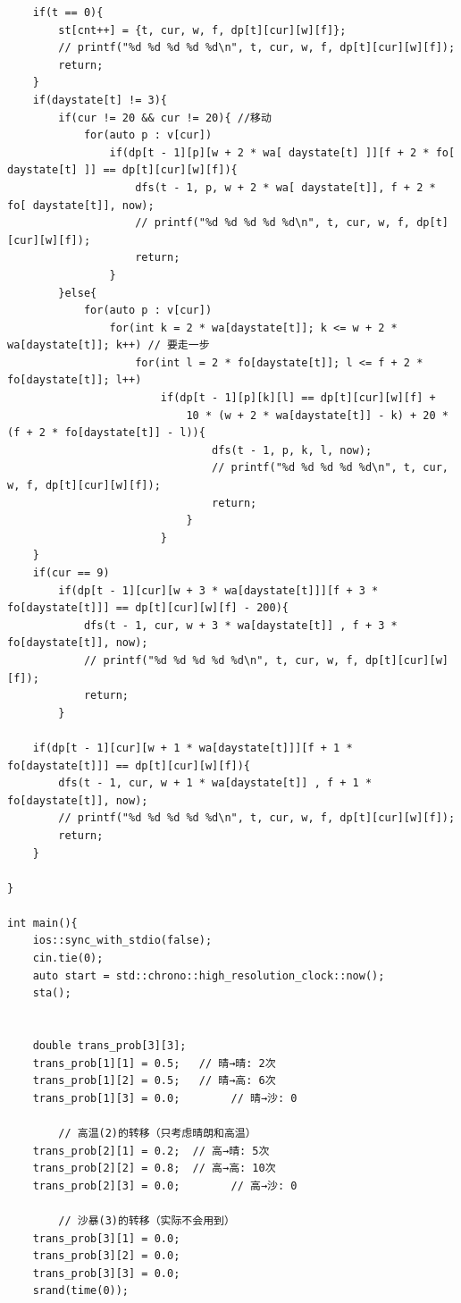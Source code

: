 \begin{verbatim}
    if(t == 0){
        st[cnt++] = {t, cur, w, f, dp[t][cur][w][f]};
        // printf("%d %d %d %d %d\n", t, cur, w, f, dp[t][cur][w][f]);
        return;
    }
    if(daystate[t] != 3){
        if(cur != 20 && cur != 20){ //移动
            for(auto p : v[cur])
                if(dp[t - 1][p][w + 2 * wa[ daystate[t] ]][f + 2 * fo[ daystate[t] ]] == dp[t][cur][w][f]){
                    dfs(t - 1, p, w + 2 * wa[ daystate[t]], f + 2 * fo[ daystate[t]], now);
                    // printf("%d %d %d %d %d\n", t, cur, w, f, dp[t][cur][w][f]);
                    return;
                }
        }else{
            for(auto p : v[cur])
                for(int k = 2 * wa[daystate[t]]; k <= w + 2 * wa[daystate[t]]; k++) // 要走一步
                    for(int l = 2 * fo[daystate[t]]; l <= f + 2 * fo[daystate[t]]; l++)
                        if(dp[t - 1][p][k][l] == dp[t][cur][w][f] + 
                            10 * (w + 2 * wa[daystate[t]] - k) + 20 * (f + 2 * fo[daystate[t]] - l)){
                                dfs(t - 1, p, k, l, now);
                                // printf("%d %d %d %d %d\n", t, cur, w, f, dp[t][cur][w][f]);
                                return;
                            }
                        }
    }
    if(cur == 9)
        if(dp[t - 1][cur][w + 3 * wa[daystate[t]]][f + 3 * fo[daystate[t]]] == dp[t][cur][w][f] - 200){
            dfs(t - 1, cur, w + 3 * wa[daystate[t]] , f + 3 * fo[daystate[t]], now);
            // printf("%d %d %d %d %d\n", t, cur, w, f, dp[t][cur][w][f]);
            return;
        }

    if(dp[t - 1][cur][w + 1 * wa[daystate[t]]][f + 1 * fo[daystate[t]]] == dp[t][cur][w][f]){
        dfs(t - 1, cur, w + 1 * wa[daystate[t]] , f + 1 * fo[daystate[t]], now);
        // printf("%d %d %d %d %d\n", t, cur, w, f, dp[t][cur][w][f]);
        return;
    }
    
}

int main(){
    ios::sync_with_stdio(false);
    cin.tie(0);
    auto start = std::chrono::high_resolution_clock::now();
    sta();
    

    double trans_prob[3][3];
    trans_prob[1][1] = 0.5;   // 晴→晴: 2次
    trans_prob[1][2] = 0.5;   // 晴→高: 6次
    trans_prob[1][3] = 0.0;        // 晴→沙: 0
        
        // 高温(2)的转移（只考虑晴朗和高温）
    trans_prob[2][1] = 0.2;  // 高→晴: 5次
    trans_prob[2][2] = 0.8;  // 高→高: 10次
    trans_prob[2][3] = 0.0;        // 高→沙: 0
        
        // 沙暴(3)的转移（实际不会用到）
    trans_prob[3][1] = 0.0;
    trans_prob[3][2] = 0.0;
    trans_prob[3][3] = 0.0;
    srand(time(0));
    

\end{verbatim}
